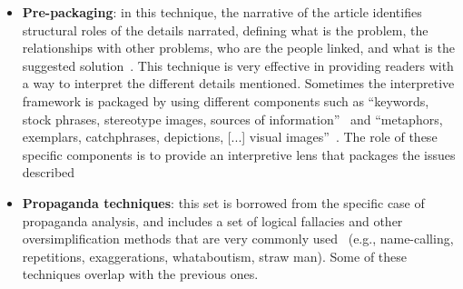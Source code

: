 \begin{itemize}
    
    \item \textbf{Pre-packaging}: in this technique, the narrative of the article identifies structural roles of the details narrated, defining what is the problem, the relationships with other problems, who are the people linked, and what is the suggested solution~\cite{entman1993framing,bell1991language,zahid2019towards}.
    This technique is very effective in providing readers with a way to interpret the different details mentioned.
    Sometimes the interpretive framework is packaged by using different components such as ``keywords, stock phrases, stereotype images, sources of information''~\cite{entman1993framing} and ``metaphors, exemplars, catchphrases, depictions, [...] visual images''~\cite{gamson1989media}.
    The role of these specific components is to provide an interpretive lens that packages the issues described
    
    \item \textbf{Propaganda techniques}: this set is borrowed from the specific case of propaganda analysis, and includes a set of logical fallacies and other oversimplification methods that are very commonly used~\cite{da2019fine} (e.g., name-calling, repetitions, exaggerations, whataboutism, straw man).
    Some of these techniques overlap with the previous ones.
\end{itemize}


